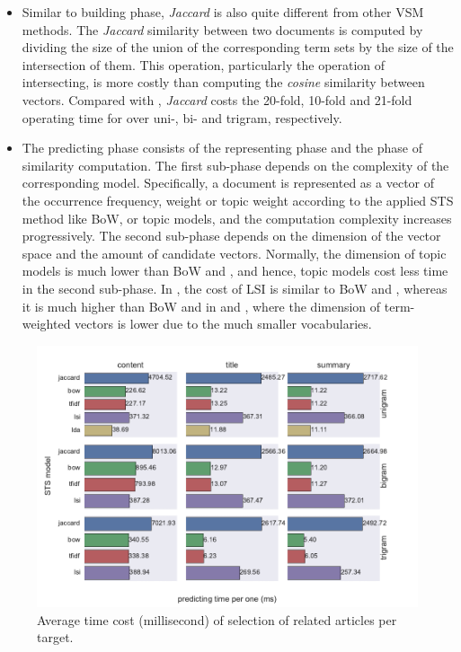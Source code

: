 \begin{itemize}
\item Similar to building phase, \textit{Jaccard} is also quite different from other VSM methods. The \textit{Jaccard} similarity between two documents is computed by dividing the size of the union of the corresponding term sets by the size of the intersection of them. This operation, particularly the operation of intersecting, is more costly than computing the \textit{cosine} similarity between vectors. Compared with \tfidf{}, \textit{Jaccard} costs the 20-fold, 10-fold and 21-fold operating time for \icontent{} over uni-, bi- and trigram, respectively.

\item The predicting phase consists of the representing phase and the phase of similarity computation. The first sub-phase depends on the complexity of the corresponding model. Specifically, a document is represented as a vector of the occurrence frequency, \tfidf{} weight or topic weight according to the applied STS method like BoW, \tfidf{} or topic models, and the computation complexity increases progressively. The second sub-phase depends on the dimension of the vector space and the amount of candidate vectors. Normally, the dimension of topic models is much lower than BoW and \tfidf{}, and hence, topic models cost less time in the second sub-phase. In \icontent{}, the cost of LSI is similar to BoW and \tfidf{}, whereas it is much higher than BoW and \tfidf{} in \ititle{} and \isummary{}, where the dimension of term-weighted vectors is lower due to the much smaller vocabularies. 

\end{itemize} 

\begin{figure}[!htb]
    \centering
    \includegraphics[width=\textwidth]{fig/predicting_time}
    \caption[Average time cost (millisecond) of selection of related articles per target]{Average time cost (millisecond) of selection of related articles per target.}
    \label{fig:predict_time}
\end{figure}


